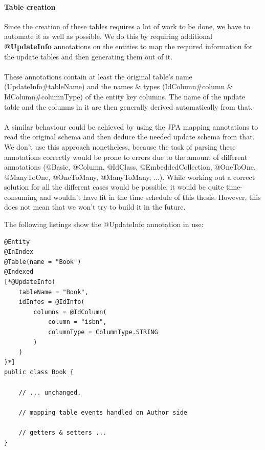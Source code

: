 \pagebreak

\paragraph{Table creation} \label{creating_the_tables}

Since the creation of these tables requires a lot of work to be done, we have to automate it as well as possible. We do this by requiring additional \textbf{@UpdateInfo} annotations on the entities to map the required information for the update tables and then generating them out of it.
\\\\
These annotations contain at least the original table's name (UpdateInfo\#tableName) and the names \& types (IdColumn\#column \& IdColumn\#columnType) of the entity key columns. The name of the update table and the columns in it are then generally derived automatically from that. 
\\\\
A similar behaviour could be achieved by using the JPA mapping annotations to read the original schema and then deduce the needed update schema from that. We don't use this approach nonetheless, because the task of parsing these annotations correctly would be prone to errors due to the amount of different annotations (@Basic, @Column, @IdClass, @EmbeddedCollection, @OneToOne, @ManyToOne, @OneToMany, @ManyToMany, ...). While working out a correct solution for all the different cases would be possible, it would be quite time-consuming and wouldn't have fit in the time schedule of this thesis. However, this does not mean that we won't try to build it in the future.

\pagebreak
\noindent
The following listings show the @UpdateInfo annotation in use:
\\
\lstset{language=java}
\begin{lstlisting}[frame=htrbl, caption={Book.java with Hibernate Search annotations}, label={lst:book.java_3}]
@Entity
@InIndex
@Table(name = "Book")
@Indexed
[*@UpdateInfo(
	tableName = "Book", 
	idInfos = @IdInfo(
		columns = @IdColumn(
			column = "isbn", 
			columnType = ColumnType.STRING
		)
	)
)*]
public class Book {

	// ... unchanged. 
	
	// mapping table events handled on Author side
	
	// getters & setters ...
}
\end{lstlisting}

